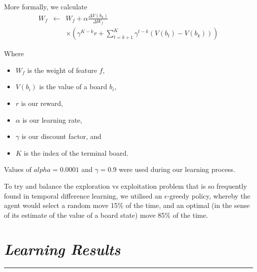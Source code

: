 \documentclass[10pt]{report}
\begin{document}
\begin{multicols}{2}
More formally, we calculate 
\begin{eqnarray}
	W_f  & \leftarrow & W_f + \alpha \frac{\Delta V(b_k)}{\Delta W_f} \nonumber  \\
	&&  \times \left(\gamma^{K-k}r + \sum_{t=k+1}^K \gamma^{t-k}\left(V(b_t) - V(b_k)\right)\right) \nonumber
\end{eqnarray}

Where
   \begin{itemize}
  \item
  	$W_f$ is the weight of feature $f$,
  \item
	$V(b_i)$ is the value of a board $b_i$,
  \item
	$r$ is our reward,
 \item
	$\alpha$ is our learning rate,
  \item
	$\gamma$ is our discount factor, and
  \item
	$K$ is the index of the terminal board.
  \end{itemize}

Values of $alpha = 0.0001$ and $\gamma = 0.9$ were used during our learning process.

To try and balance the exploration vs exploitation problem that is so frequently found in temporal difference learning, we utilised an $\epsilon$-greedy policy, whereby the agent would select a random move 15\% of the time, and an optimal (in the sense of its estimate of the value of a board state) move 85\% of the time.
\section*{\emph{\textmd{Learning Results}}}
\hrule


\end{multicols}
\end{document}
